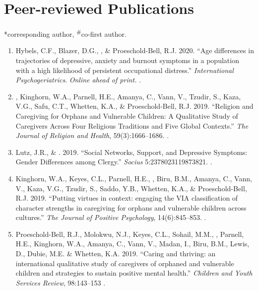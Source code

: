 \newcommand{\Revision}{\textit{under revision}}
\newcommand{\CS}{*} %
\newcommand{\CF}{\textsuperscript{\#}} %

\section*{Peer-reviewed Publications}
\CS corresponding author, \CF co-first author.

\begin{enumerate}
\item Hybels, C.F., Blazer, D.G., \Tian, \& Proeschold-Bell, R.J. 2020. ``Age differences in trajectories of depressive, anxiety and burnout symptoms in a population with a high likelihood of persistent occupational distress.'' \emph{International Psychogeriatrics}. \textit{Online ahead of print.} .

\item \Tian, Kinghorn, W.A., Parnell, H.E., Amanya, C., Vann, V., Tzudir, S., Kaza, V.G., Safu, C.T., Whetten, K.A., \& Proeschold-Bell, R.J. 2019. ``Religion and Caregiving for Orphans and Vulnerable Children: A Qualitative Study of Caregivers Across Four Religious Traditions and Five Global Contexts.'' \emph{The Journal of Religion and Health}, 59(3):1666--1686. .

\item Lutz, J.R., \& \Tian\CS. 2019. ``Social Networks, Support, and Depressive Symptoms: Gender Differences among Clergy.'' \emph{Socius} 5:2378023119873821. .

\item Kinghorn, W.A., Keyes, C.L., Parnell, H.E., \Tian, Biru, B.M., Amanya, C., Vann, V., Kaza, V.G., Tzudir, S., Saddo, Y.B., Whetten, K.A., \& Proeschold-Bell, R.J. 2019. ``Putting virtues in context: engaging the VIA classification of character strengths in caregiving for orphans and vulnerable children across cultures.'' \emph{The Journal of Positive Psychology}, 14(6):845--853. .

\item Proeschold-Bell, R.J., Molokwu, N.J., Keyes, C.L., Sohail, M.M., \Tian, Parnell, H.E., Kinghorn, W.A., Amanya, C., Vann, V., Madan, I., Biru, B.M., Lewis, D., Dubie, M.E. \& Whetten, K.A. 2019. ``Caring and thriving: an international qualitative study of caregivers of orphaned and vulnerable children and strategies to sustain positive mental health.''  \emph{Children and Youth Services Review}, 98:143--153  .


\end{enumerate}
